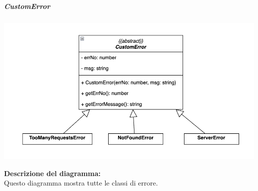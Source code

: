 \subparagraph{CustomError}
\begin{center}
      \includegraphics[scale=0.6]{template/images/uml_front/logic/CustomError.png}
\end{center}
\textbf{Descrizione del diagramma:}\\
Questo diagramma mostra tutte le classi di errore.
